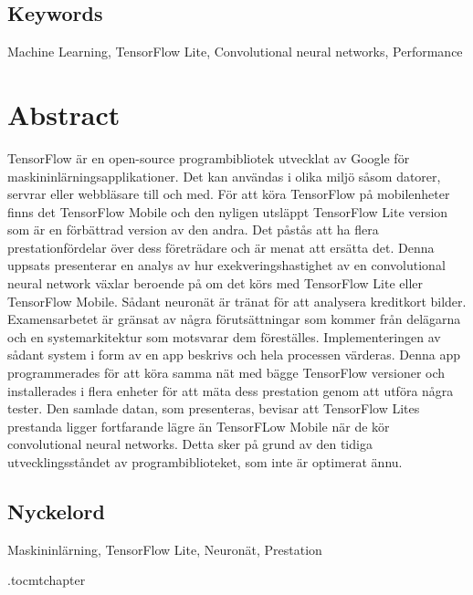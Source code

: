 \subsection*{Keywords}
Machine Learning, TensorFlow Lite, Convolutional neural networks, Performance

\newpage
\section*{Abstract}
TensorFlow är en open-source programbibliotek utvecklat av Google för maskininlärningsapplikationer. Det kan användas i olika miljö såsom datorer, servrar eller webbläsare till och med. För att köra TensorFlow på mobilenheter finns det TensorFlow Mobile och den nyligen utsläppt TensorFlow Lite version som är en förbättrad version av den andra. Det påstås att ha flera prestationfördelar över dess företrädare och är menat att ersätta det. Denna uppsats presenterar en analys av hur exekveringshastighet av en convolutional neural network växlar beroende på om det körs med TensorFlow Lite eller TensorFlow Mobile. Sådant neuronät är tränat för att analysera kreditkort bilder. Examensarbetet är gränsat av några förutsättningar som kommer från delägarna och en systemarkitektur som motsvarar dem föreställes. Implementeringen av sådant system i form av en app beskrivs och hela processen värderas. Denna app programmerades för att köra samma nät med bägge TensorFlow versioner och installerades i flera enheter för att mäta dess prestation genom att utföra några tester. Den samlade datan, som presenteras, bevisar att TensorFlow Lites prestanda ligger fortfarande lägre än TensorFLow Mobile när de kör convolutional neural networks. Detta sker på grund av den tidiga utvecklingsståndet av programbiblioteket, som inte är optimerat ännu.

\subsection*{Nyckelord}
Maskininlärning, TensorFlow Lite, Neuronät, Prestation


\etocdepthtag.toc{mtchapter}
\newpage
\thispagestyle{fancy}
\tableofcontents
\thispagestyle{fancy} %


